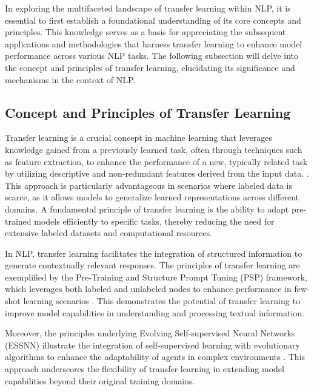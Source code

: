 In exploring the multifaceted landscape of transfer learning within NLP, it is essential to first establish a foundational understanding of its core concepts and principles. This knowledge serves as a basis for appreciating the subsequent applications and methodologies that harness transfer learning to enhance model performance across various NLP tasks. The following subsection will delve into the concept and principles of transfer learning, elucidating its significance and mechanisms in the context of NLP.





\subsection{Concept and Principles of Transfer Learning} \label{subsec:Concept and Principles of Transfer Learning}



Transfer learning is a crucial concept in machine learning that leverages knowledge gained from a previously learned task, often through techniques such as feature extraction, to enhance the performance of a new, typically related task by utilizing descriptive and non-redundant features derived from the input data. \cite{pihlgren2024systematicperformanceanalysisdeep}. This approach is particularly advantageous in scenarios where labeled data is scarce, as it allows models to generalize learned representations across different domains. A fundamental principle of transfer learning is the ability to adapt pre-trained models efficiently to specific tasks, thereby reducing the need for extensive labeled datasets and computational resources.



In NLP, transfer learning facilitates the integration of structured information to generate contextually relevant responses. The principles of transfer learning are exemplified by the Pre-Training and Structure Prompt Tuning (PSP) framework, which leverages both labeled and unlabeled nodes to enhance performance in few-shot learning scenarios \cite{ge2024psppretrainingstructureprompt}. This demonstrates the potential of transfer learning to improve model capabilities in understanding and processing textual information.



Moreover, the principles underlying Evolving Self-supervised Neural Networks (ESSNN) illustrate the integration of self-supervised learning with evolutionary algorithms to enhance the adaptability of agents in complex environments \cite{le2019evolvingselfsupervisedneuralnetworks}. This approach underscores the flexibility of transfer learning in extending model capabilities beyond their original training domains.



